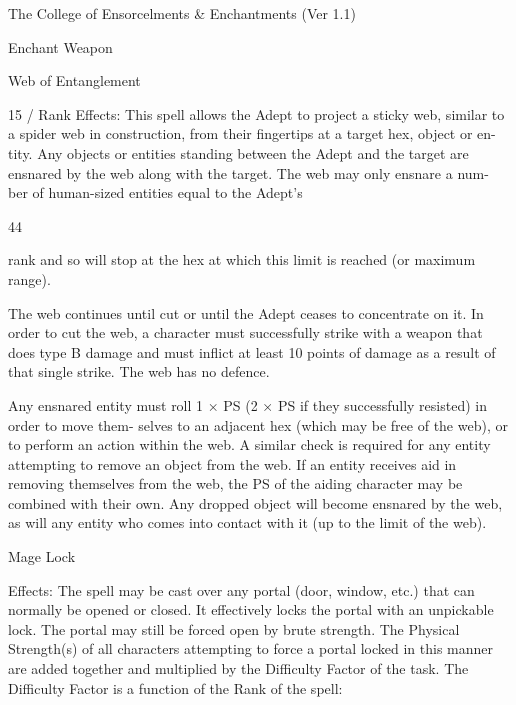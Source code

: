\begin{Chapter}{The College of Ensorcelments \& Enchantments (Ver 1.1)}
\begin{spell}[S-4]{Enchant Weapon }
\end{spell}

\begin{spell}[S-5]{Web of Entanglement }

15 / Rank 
Effects:  This  spell  allows  the  Adept  to  project  a 
sticky web, similar to a spider web in construction, 
from  their  fingertips  at  a  target  hex,  object  or  en-
tity.  Any  objects  or  entities  standing  between  the 
Adept and the target are ensnared by the web along 
with the target. The web may only ensnare a num-
ber  of  human-sized  entities  equal  to  the  Adept’s 

44 

rank and so will stop at the hex at which this limit 
is reached (or maximum range). 

The  web  continues  until  cut  or  until  the  Adept 
ceases to concentrate on it. In order to cut the web, 
a character must successfully strike with a weapon 
that does type B damage and must inflict at least 10 
points  of  damage  as  a  result  of  that  single  strike. 
The web has no defence. 

Any  ensnared  entity  must  roll  1  ×  PS  (2  ×  PS  if 
they  successfully  resisted)  in  order  to  move  them-
selves to an adjacent hex (which may be free of the 
web),  or  to  perform  an  action  within  the  web.  A 
similar  check  is  required  for  any  entity  attempting 
to  remove  an  object  from  the  web.  If  an  entity 
receives aid in removing themselves from the web, 
the  PS  of  the  aiding  character  may  be  combined 
with  their  own.  Any  dropped  object  will  become 
ensnared by the web, as will any entity who comes 
into contact with it (up to the limit of the web). 

\end{spell}

\begin{spell}[S-6]{Mage Lock }

Effects:  The  spell  may  be  cast  over  any  portal 
(door,  window,  etc.)  that  can  normally  be  opened 
or  closed.  It  effectively  locks  the  portal  with  an 
unpickable  lock.  The  portal  may  still  be  forced 
open by brute strength. The Physical Strength(s) of 
all characters attempting to force a portal locked in 
this  manner  are  added  together  and  multiplied  by 
the  Difficulty  Factor  of  the  task.  The  Difficulty 
Factor is a function of the Rank of the spell: 


\end{spell}
\end{Chapter}
